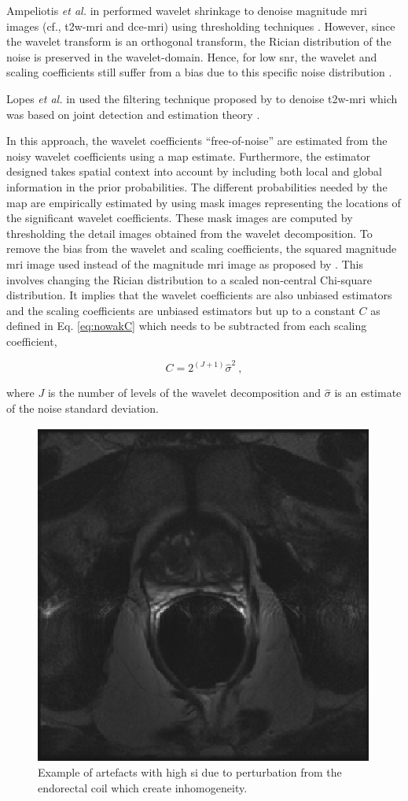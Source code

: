 Ampeliotis \textit{et al.} in \cite{Ampeliotis2007,Ampeliotis2008} performed wavelet shrinkage to denoise magnitude \ac{mri} images (cf., \ac{t2w}-\ac{mri} and \ac{dce}-\ac{mri}) using thresholding techniques \cite{Mallat2008}.
However, since the wavelet transform is an orthogonal transform, the Rician distribution of the noise is preserved in the wavelet-domain.
Hence, for low \ac{snr}, the wavelet and scaling coefficients still suffer from a bias due to this specific noise distribution \cite{Nowak1999}.
 
Lopes \textit{et al.} in \cite{Lopes2011} used the filtering technique proposed by \cite{Pizurica2003} to denoise \ac{t2w}-\ac{mri} which was based on joint detection and estimation theory \cite{Pizurica2003}.
{\color{blue}
In this approach, the wavelet coefficients ``free-of-noise'' are estimated from the noisy wavelet coefficients using a \ac{map} estimate.
Furthermore, the estimator designed takes spatial context into account by including both local and global information in the prior probabilities.
The different probabilities needed by the \ac{map} are empirically estimated by using mask images representing the locations of the significant wavelet coefficients.
These mask images are computed by thresholding the detail images obtained from the wavelet decomposition.
To remove the bias from the wavelet and scaling coefficients, the squared magnitude \ac{mri} image used instead of the magnitude \ac{mri} image as proposed by \cite{Nowak1999}.
This involves changing the Rician distribution to a scaled non-central Chi-square distribution.
It implies that the wavelet coefficients are also unbiased estimators and the scaling coefficients are unbiased estimators but up to a constant $C$ as defined in Eq. \eqref{eq:nowakC} which needs to be subtracted from each scaling coefficient,

\begin{equation}
	C=2^{(J+1)}\hat{\sigma}^2 \ ,
	\label{eq:nowakC}
\end{equation}

\noindent where $J$ is the number of levels of the wavelet decomposition and $\hat{\sigma}$ is an estimate of the noise standard deviation.
}
\begin{figure}
\centering
	\includegraphics[width=0.3\linewidth]{3_review/figures/processing/pre-processing/bias/t2w_bias_antenna.eps}
	\caption[Inhomogeneity artefacts due to perturbation of the endorectal coil.]{Example of artefacts with high \ac{si} due to perturbation from the endorectal coil which create inhomogeneity.}
	\label{fig:bias}
\end{figure}


